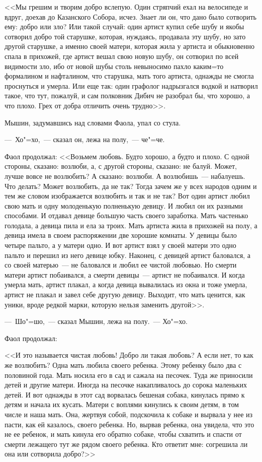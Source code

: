 <<Мы грешим и творим добро вслепую. Один стряпчий ехал на велосипеде и вдруг, доехав до Казанского Собора, исчез. Знает ли он, что дано было сотворить ему: добро или зло? Или такой случай: один артист купил себе шубу и якобы сотворил добро той старушке, которая, нуждаясь, продавала эту шубу, но зато другой старушке, а именно своей матери, которая жила у артиста и обыкновенно спала в прихожей, где артист вешал свою новую шубу, он сотворил по всей видимости зло, ибо от новой шубы столь невыносимо пахло каким=то формалином и нафталином, что старушка, мать того артиста, однажды не смогла проснуться и умерла. Или еще так: один графолог надрызгался водкой и натворил такое, что тут, пожалуй, и сам полковник Дибич не разобрал бы, что хорошо, а что плохо. Грех от добра отличить очень трудно>>.

Мышин, задумавшись над словами Фаола, упал со стула.

---~Хо"=хо,~--- сказал он, лежа на полу,~--- че"=че.

Фаол продолжал: <<Возьмем любовь. Будто хорошо, а будто и плохо. С одной стороны, сказано: возлюби, а, с другой стороны, сказано: не балуй. Может, лучше вовсе не возлюбить? А сказано: возлюби. А возлюбишь~--- набалуешь. Что делать? Может возлюбить, да не так? Тогда зачем же у всех народов одним и тем же словом изображается возлюбить и так и не так? Вот один артист любил свою мать и одну молоденькую полненькую девицу. И любил он их разными способами. И отдавал девице большую часть своего заработка. Мать частенько голодала, а девица пила и ела за троих. Мать артиста жила в прихожей на полу, а девица имела в своем распоряжении две хорошие комнаты. У девицы было четыре пальто, а у матери одно. И вот артист взял у своей матери это одно пальто и перешил из него девице юбку. Наконец, с девицей артист баловался, а со своей матерью~--- не баловался и любил ее чистой любовью. Но смерти матери артист побаивался, а смерти девицы~--- артист не побаивался. И когда умерла мать, артист плакал, а когда девица вывалилась из окна и тоже умерла, артист не плакал и завел себе другую девицу. Выходит, что мать ценится, как уники, вроде редкой марки, которую нельзя заменить другой>>.

---~Шо"=шо,~--- сказал Мышин, лежа на полу.~--- Хо"=хо.

Фаол продолжал:

<<И это называется чистая любовь! Добро ли такая любовь? А если нет, то как же возлюбить? Одна мать любила своего ребенка. Этому ребенку было два с половиной года. Мать носила его в сад и сажала на песочек. Туда же приносили детей и другие матери. Иногда на песочке накапливалось до сорока маленьких детей. И вот однажды в этот сад ворвалась бешеная собака, кинулась прямо к детям и начала их кусать. Матери с воплями кинулись к своим детям, в том числе и наша мать. Она, жертвуя собой, подскочила к собаке и вырвала у нее из пасти, как ей казалось, своего ребенка. Но, вырвав ребенка, она увидела, что это не ее ребенок, и мать кинула его обратно собаке, чтобы схватить и спасти от смерти лежащего тут же рядом своего ребенка. Кто ответит мне: согрешила ли она или сотворила добро?>>

